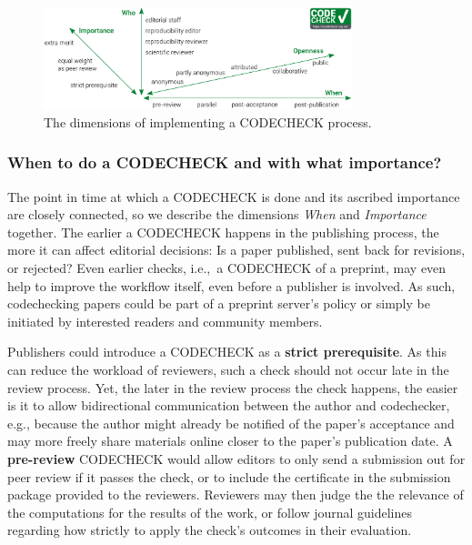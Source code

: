 \documentclass[12pt]{article}
\begin{document}
\begin{figure}
  \centering
      \includegraphics[width=0.8\textwidth]{figs/codecheck_dimensions.pdf}
  \caption{The dimensions of implementing a CODECHECK process.}
  \label{fig:dimensions}
\end{figure}

\subsubsection*{When to do a CODECHECK and with what importance?}
\label{when-to-do-a-codecheck}

The point in time at which a CODECHECK is done and its ascribed importance are closely connected, so we describe the dimensions \emph{When} and \emph{Importance} together.
The earlier a CODECHECK happens in the publishing process, the more it can affect editorial decisions:
Is a paper published, sent back for revisions, or rejected?
Even earlier checks, i.e.,~a CODECHECK of a preprint, may even help to improve the workflow itself, even before a publisher is involved.
As such, codechecking papers could be part of a preprint server's policy or simply be initiated by interested readers and community members.

Publishers could introduce a CODECHECK as a \textbf{strict prerequisite}.
As this can reduce the workload of reviewers, such a check should not occur late in the review process.
Yet, the later in the review process the check happens, the easier is it to allow bidirectional communication between the author and codechecker, e.g., because the author might already be notified of the paper's acceptance and may more freely share materials online closer to the paper's publication date.
A \textbf{pre-review} CODECHECK would allow editors to only send a submission out for peer review if it passes the check, or to include the certificate in the submission package provided to the reviewers.
Reviewers may then judge the the relevance of the computations for the results of the work, or follow journal guidelines regarding how strictly to apply the check's outcomes in their evaluation.
\end{document}
